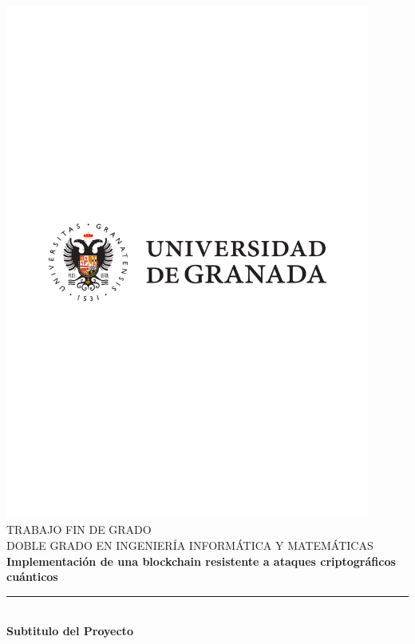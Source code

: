 \begin{titlepage}
 
 
\newlength{\centeroffset}
\setlength{\centeroffset}{-0.5\oddsidemargin}
\addtolength{\centeroffset}{0.5\evensidemargin}
\thispagestyle{empty}

\noindent\hspace*{\centeroffset}\begin{minipage}{\textwidth}

\centering
\includegraphics[width=0.9\textwidth]{portada/imagenes/logoModernoUGR.pdf}\\[1.4cm]

\textsc{ \Large TRABAJO FIN DE GRADO\\[0.2cm]}
\textsc{ DOBLE GRADO EN INGENIERÍA INFORMÁTICA Y MATEMÁTICAS }\\[1cm]
% 
{\Huge\bfseries Implementación de una blockchain resistente a ataques criptográficos cuánticos\\
}
\noindent\rule[-1ex]{\textwidth}{3pt}\\[3.5ex]
{\large\bfseries Subtitulo del Proyecto}
\end{minipage}


\end{titlepage}
